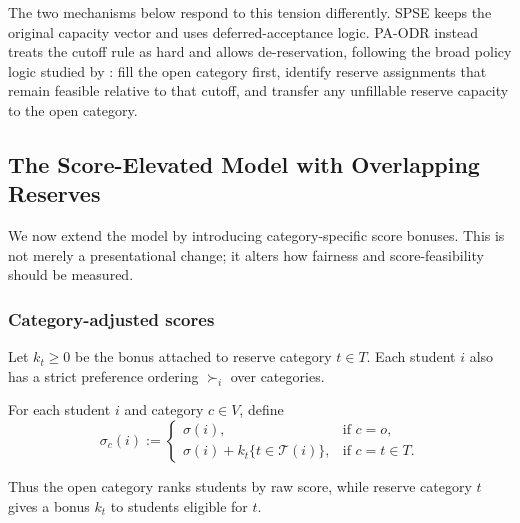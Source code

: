 \documentclass[runningheads]{llncs}
\newcommand{\T}{\mathcal{T}}
\newcommand{\1}{\mathbf{1}}
\begin{document}
The two mechanisms below respond to this tension differently. SPSE keeps the original capacity vector and uses deferred-acceptance logic. PA-ODR instead treats the cutoff rule as hard and allows de-reservation, following the broad policy logic studied by \cite{AyTu23a}: fill the open category first, identify reserve assignments that remain feasible relative to that cutoff, and transfer any unfillable reserve capacity to the open category.

\subsection{The Score-Elevated Model with Overlapping Reserves}

We now extend the model by introducing category-specific score bonuses. This is not merely a presentational change; it alters how fairness and score-feasibility should be measured.

\subsubsection{Category-adjusted scores}

Let $k_t\ge 0$ be the bonus attached to reserve category $t\in T$. Each student $i$ also has a strict preference ordering $\succ_i$ over categories.

\begin{definition}
For each student $i$ and category $c\in V$, define
\[
\sigma_c(i):=
\begin{cases}
\sigma(i), & \text{if } c=o,\\[4pt]
\sigma(i)+k_t\{t\in\T(i)\}, & \text{if } c=t\in T.
\end{cases}
\]
\end{definition}

Thus the open category ranks students by raw score, while reserve category $t$ gives a bonus $k_t$ to students eligible for $t$.



\end{document}
